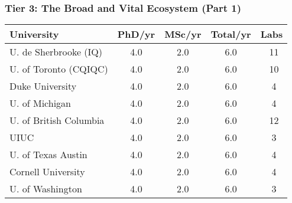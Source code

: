 \documentclass[aspectratio=169]{beamer}
\newcommand{\tabletext}{\normalsize}
\begin{document}
\begin{frame}
    \frametitle{Tier 3: The Broad and Vital Ecosystem (Part 1)}
    \subtitle{Medium producers with 4-6 total theses per year}
    
    \begin{table}
        \centering
        \tabletext
        \begin{tabularx}{\textwidth}{
            l
            S[table-format=1.1]
            S[table-format=1.1]
            S[table-format=1.1]
            S[table-format=2.0, table-space-text-pre=~]
        }
            \toprule
            \textbf{University} & {\textbf{PhD/yr}} & {\textbf{MSc/yr}} & {\textbf{Total/yr}} & {\textbf{Labs}} \\
            \midrule
            U. de Sherbrooke (IQ) & 4.0 & 2.0 & 6.0 & ~11 \\
            U. of Toronto (CQIQC) & 4.0 & 2.0 & 6.0 & ~10 \\
            Duke University & 4.0 & 2.0 & 6.0 & ~4 \\
            U. of Michigan & 4.0 & 2.0 & 6.0 & ~4 \\
            U. of British Columbia & 4.0 & 2.0 & 6.0 & ~12 \\
            UIUC & 4.0 & 2.0 & 6.0 & ~3 \\
            U. of Texas Austin & 4.0 & 2.0 & 6.0 & ~4 \\
            Cornell University & 4.0 & 2.0 & 6.0 & ~4 \\
            U. of Washington & 4.0 & 2.0 & 6.0 & ~3 \\
            \bottomrule
        \end{tabularx}
    \end{table}
\end{frame}
\end{document}
